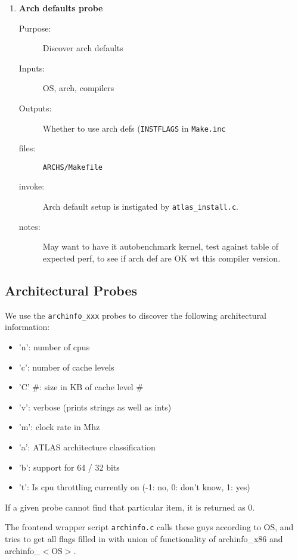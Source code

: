 \documentclass[11pt]{article}
\begin{document}
\begin{enumerate}
\begin{description}
   \end{description}
\item {\bf Arch defaults probe}
   \begin{description}
   \item [Purpose:] Discover arch defaults
   \item [Inputs:]  OS, arch, compilers
   \item [Outputs:] Whether to use arch defs ({\tt INSTFLAGS} in {\tt Make.inc}
   \item [files:] {\tt ARCHS/Makefile}
   \item [invoke:] Arch default setup is instigated by {\tt atlas\_install.c}.
   \item [notes:] May want to have it autobenchmark kernel, test against
         table of expected perf, to see if arch def are OK wt this compiler
         version.
   \end{description}
\end{enumerate}

\subsection{Architectural Probes}
\label{sec-archProbe}
{\samepage
We use the {\tt archinfo\_xxx} probes to discover the following architectural
information:
\begin{itemize}
\item 'n': number of cpus
\item 'c': number of cache levels
\item 'C' \#: size in KB of cache level \#
\item 'v': verbose (prints strings as well as ints)
\item 'm': clock rate in Mhz
\item 'a': ATLAS architecture classification 
\item 'b': support for 64 / 32 bits
\item 't': Is cpu throttling currently on (-1: no, 0: don't know, 1: yes)
\end{itemize}
If a given probe cannot find that particular item, it is returned as 0.
}

The frontend wrapper script {\tt archinfo.c} calls these
guys according to OS, and tries to get all flags filled in with union of
functionality of archinfo\_x86 and archinfo\_$<$OS$>$.
\end{document}
